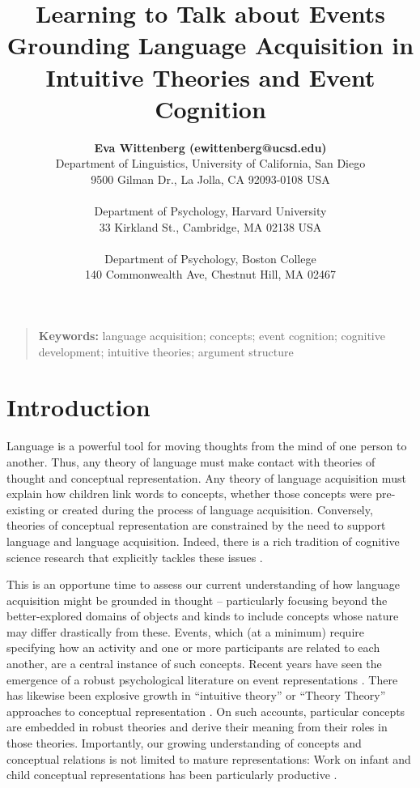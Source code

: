 \documentclass[10pt,letterpaper]{article}
\title{Learning to Talk about Events\\ Grounding Language Acquisition in Intuitive Theories and Event Cognition} %
\author{{\large \bf Eva Wittenberg (ewittenberg@ucsd.edu)} \\
  Department of Linguistics,
  University of California, San Diego \\
  9500 Gilman Dr.,
  La Jolla, CA 92093-0108 USA \\
  \AND {\large \bf Melissa Kline (mekline@mit.edu)} \\
  Department of Psychology,
  Harvard University \\
  33 Kirkland St.,
  Cambridge, MA 02138 USA \\
  \AND {\large \bf Joshua K. Hartshorne (joshua.hartshorne@bc.edu)} \\
  Department of Psychology,
  Boston College \\
  140 Commonwealth Ave,
  Chestnut Hill, MA 02467}
\begin{document}
\maketitle

\begin{quote}
\small
\textbf{Keywords:}
language acquisition; concepts; event cognition; cognitive
development; intuitive theories; argument structure
\end{quote}

\section{Introduction}

Language is a powerful tool for moving thoughts from the
mind of one person to another. Thus, any theory of language must make
contact with theories of thought and conceptual representation. Any
theory of language acquisition must explain how children link words to
concepts, whether those concepts were pre-existing or created during
the process of language acquisition. Conversely, theories of
conceptual representation are constrained by the need to support
language and language acquisition. Indeed, there is a rich tradition
of cognitive science research that explicitly tackles these issues \cite{Clark2004,Bowerman1989}.

This is an opportune time to assess our
current understanding of how language acquisition might be grounded in
thought -- particularly focusing beyond the better-explored domains of
objects and kinds to include concepts whose nature may differ drastically from these. Events, which (at a minimum) require specifying how an activity and one or more participants are related to each another, are a central instance of such concepts. Recent years have seen the emergence of a
robust psychological literature on event representations \cite{Tversky2013}. There has
likewise been explosive growth in
``intuitive theory'' or ``Theory Theory'' approaches to conceptual representation
\cite{Gopnikinpress,HOT2015,Goodman2011,Battaglia2013}. On such accounts, particular concepts are
embedded in robust theories and derive their meaning from their roles in those
theories. Importantly, our growing understanding of concepts and conceptual relations
is not limited to mature representations: Work on infant and child
conceptual representations has been particularly productive \cite{Gopnikinpress,Ettinger,Henrik2015}.
\end{document}
